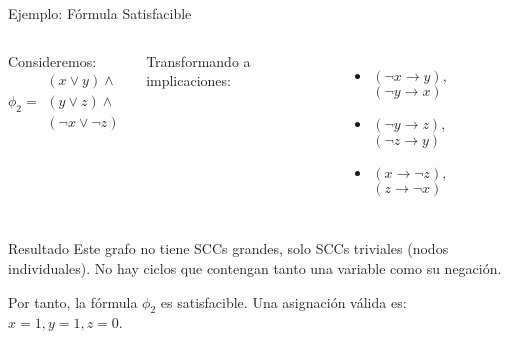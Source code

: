 \documentclass{beamer}
\begin{document}
\begin{frame}{Ejemplo: Fórmula Satisfacible}
\begin{columns}
Consideremos:
\vspace{-0.2cm}
$$\phi_2 = \begin{array}{l}
(x \lor y) \land \\
(y \lor z) \land \\
(\neg x \lor \neg z)
\end{array}$$

\vspace{0.2cm}
Transformando a implicaciones:
\vspace{-0.2cm}
\begin{itemize}
\item $(\neg x \rightarrow y)$, $(\neg y \rightarrow x)$
\item $(\neg y \rightarrow z)$, $(\neg z \rightarrow y)$
\item $(x \rightarrow \neg z)$, $(z \rightarrow \neg x)$
\end{itemize}

\vspace{-0.3cm}
\vspace{-0.5cm}
\end{columns}

\begin{block}{Resultado}
Este grafo no tiene SCCs grandes, solo SCCs triviales (nodos individuales).
No hay ciclos que contengan tanto una variable como su negación.

Por tanto, la fórmula $\phi_2$ es satisfacible. Una asignación válida es: $x=1, y=1, z=0$.
\end{block}
\end{frame}
\end{document}
